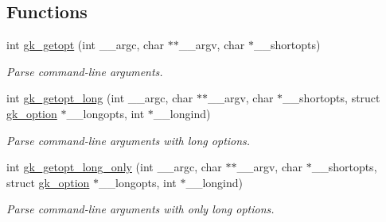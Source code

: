 \subsection*{Functions}
\begin{DoxyCompactItemize}
\item 
int \hyperlink{a00050_a2f4d59ba3b25d6d4d637de28ff8a87e5}{gk\+\_\+getopt} (int \+\_\+\+\_\+argc, char $\ast$$\ast$\+\_\+\+\_\+argv, char $\ast$\+\_\+\+\_\+shortopts)
\begin{DoxyCompactList}\small\item\em Parse command-\/line arguments. \end{DoxyCompactList}\item 
int \hyperlink{a00050_acc525a155d3432e9a66f946d41528c8f}{gk\+\_\+getopt\+\_\+long} (int \+\_\+\+\_\+argc, char $\ast$$\ast$\+\_\+\+\_\+argv, char $\ast$\+\_\+\+\_\+shortopts, struct \hyperlink{a00630}{gk\+\_\+option} $\ast$\+\_\+\+\_\+longopts, int $\ast$\+\_\+\+\_\+longind)
\begin{DoxyCompactList}\small\item\em Parse command-\/line arguments with long options. \end{DoxyCompactList}\item 
int \hyperlink{a00050_a26fc3b9b5c3c4973ee60c3f1daeb02cd}{gk\+\_\+getopt\+\_\+long\+\_\+only} (int \+\_\+\+\_\+argc, char $\ast$$\ast$\+\_\+\+\_\+argv, char $\ast$\+\_\+\+\_\+shortopts, struct \hyperlink{a00630}{gk\+\_\+option} $\ast$\+\_\+\+\_\+longopts, int $\ast$\+\_\+\+\_\+longind)
\begin{DoxyCompactList}\small\item\em Parse command-\/line arguments with only long options. \end{DoxyCompactList}\end{DoxyCompactItemize}
